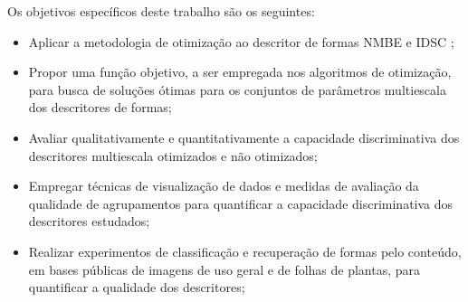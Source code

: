 

Os objetivos específicos deste trabalho são os seguintes:

\begin{itemize}
\item Aplicar a metodologia de otimização ao descritor de formas \acf{NMBE} \cite{Costa:2009} e \acf{IDSC} \cite{1467513};

\item Propor uma função objetivo, a ser empregada nos algoritmos de otimização, para busca de soluções ótimas para os conjuntos de parâmetros multiescala dos descritores de formas;

\item Avaliar qualitativamente e quantitativamente a capacidade discriminativa dos descritores multiescala otimizados e não otimizados;

\item Empregar técnicas de visualização de dados e medidas de avaliação da qualidade de agrupamentos para quantificar a capacidade discriminativa dos descritores estudados; 

\item Realizar experimentos de classificação e recuperação de formas pelo conteúdo, em bases públicas de imagens de uso geral e de folhas de plantas, para quantificar a qualidade dos descritores;

\end{itemize}




